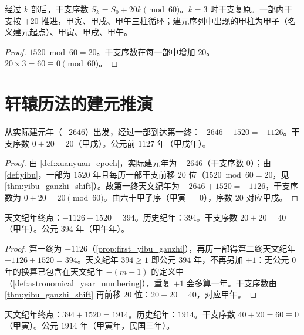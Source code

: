 \begin{theorem}[一部的干支推移定理]\label{thm:yibu_ganzhi_shift}
经过 \(k\) 部后，干支序数 \(S_k=S_0+20k\pmod{60}\)。\(k=3\) 时干支复原。一部内干支按 \(+20\) 推进，甲寅、甲戌、甲午三柱循环；建元序列中出现的甲柱为甲子（名义建元起点）、甲寅、甲戌、甲午。
\end{theorem}

\begin{proof}
\(1520\bmod 60=20\)。干支序数在每一部中增加 \(20\)。\(20\times 3=60\equiv 0\pmod{60}\)。
\end{proof}

\section{轩辕历法的建元推演}
\label{sec:xuanyuan_epoch}

\begin{proposition}[第一部终的干支确定]\label{prop:first_yibu_ganzhi}
从实际建元年（\(-2646\)）出发，经过一部到达第一终：\(-2646+1520=-1126\)。干支序数 \(0+20=20\)（甲戌）。公元前 \(1127\) 年（甲戌年）。
\end{proposition}

\begin{proof}
由 \cref{def:xuanyuan_epoch}，实际建元年为 \(-2646\)（干支序数 \(0\)）；由 \cref{def:yibu}，一部为 \(1520\) 年且每历一部干支前移 \(20\) 位（\(1520\bmod 60=20\)，见 \cref{thm:yibu_ganzhi_shift}）。故第一终天文纪年为 \(-2646+1520=-1126\)，干支序数为 \(0+20=20\pmod{60}\)。由六十甲子序（甲寅 \(=0\)），序数 \(20\) 对应甲戌。
\end{proof}

\begin{proposition}[第二部终的干支确定]\label{prop:second_yibu_correction}
天文纪年终点：\(-1126+1520=394\)。历史纪年：\(394\)。干支序数 \(20+20=40\)（甲午）。公元 \(394\) 年（甲午年）。
\end{proposition}

\begin{proof}
第一终为 \(-1126\)（\cref{prop:first_yibu_ganzhi}），再历一部得第二终天文纪年 \(-1126+1520=394\)。天文纪年 \(394\ge 1\) 即公元 \(394\) 年，不再另加 \(+1\)：无公元 \(0\) 年的换算已包含在天文纪年 \(-(m-1)\) 的定义中（\cref{def:astronomical_year_numbering}），重复 \(+1\) 会多算一年。干支序数由 \cref{thm:yibu_ganzhi_shift} 再前移 \(20\) 位：\(20+20=40\)，对应甲午。
\end{proof}

\begin{proposition}[第三部终的干支确定]\label{prop:third_yibu_ganzhi}
天文纪年终点：\(394+1520=1914\)。历史纪年：\(1914\)。干支序数 \(40+20=60\equiv 0\)（甲寅）。公元 \(1914\) 年（甲寅年，民国三年）。
\end{proposition}

